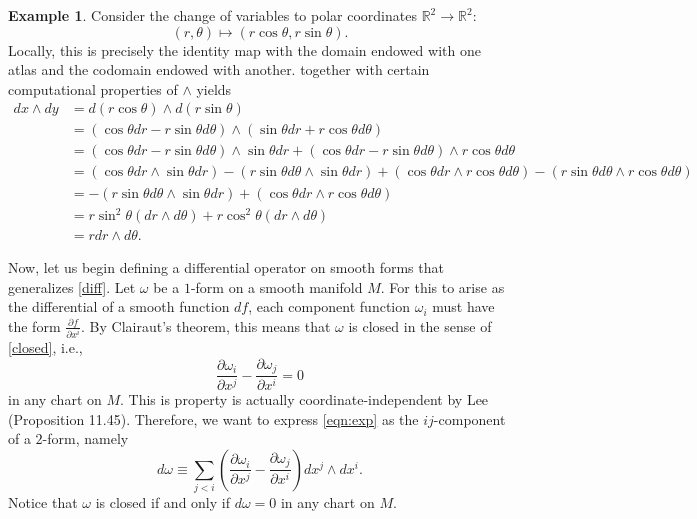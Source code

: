 \documentclass[10pt,letterpaper,cm]{nupset}
\theoremstyle{definition}
\newtheorem{exmp}[definition]{Example}
\theoremstyle{theorem}
\theoremstyle{remark}
\newcommand{\R}{\mathbb R}
\newcommand{\1}{\mathbf{1}}
\newcommand{\0}{\vec 0}
\begin{document}
\begin{exmp}
Consider the change of variables to polar coordinates $\R^2 \to \R^2$: $$\left(r, \theta\right) \mapsto \left(r\cos \theta, r\sin \theta\right).$$ Locally, this is precisely the identity map with the domain endowed with one atlas and the codomain endowed with another.  together with certain computational properties of $\wedge$ yields
\begin{align*}  dx \wedge dy & = d(r\cos \theta) \wedge d(r\sin \theta) \\ &=   \left(\cos \theta dr - r\sin \theta d\theta\right) \wedge \left(\sin \theta dr +r \cos \theta d\theta\right) \\ &= \left(\cos \theta dr - r\sin \theta d\theta\right) \wedge \sin \theta dr + \left(\cos \theta dr - r\sin \theta d\theta\right) \wedge r \cos \theta d\theta \\ & = \left(\cos \theta dr \wedge \sin \theta dr\right) - \left(r \sin \theta d \theta \wedge \sin \theta dr\right) +  \left(\cos \theta dr \wedge r \cos \theta d\theta\right) - \left(r\sin \theta d \theta \wedge r \cos \theta d \theta\right)\\ & =  {-\left(r \sin \theta d \theta \wedge \sin \theta dr\right)} +  \left(\cos \theta dr \wedge r \cos \theta d\theta\right) \\ & = r\sin^2\theta(dr \wedge d\theta) + r\cos^2 \theta(dr \wedge d\theta)\\ & = rdr \wedge d\theta.
\end{align*}
\end{exmp}

\bigskip

Now, let us begin defining a differential operator on smooth forms that generalizes \cref{diff}. Let $\omega$ be a $1$-form on a smooth manifold $M$. For this to arise as the differential of a smooth function $d{f}$, each component function $\omega_i$ must have the form $\frac{\partial{f}}{\partial{x^i}}$. By Clairaut's theorem, this means that $\omega$ is closed in the sense of \cref{closed}, i.e.,
\[ \label{eqn:exp}
\frac{\partial{\omega_i}}{\partial{x^j}} - \frac{\partial{\omega_j}}{\partial{x^i}} =0 \tag{$\ast$}
\] in any chart on $M$.
This is property is actually coordinate-independent by Lee (Proposition 11.45). Therefore, we want to express \eqref{eqn:exp} as the $ij$-component of a $2$-form, namely
\[
d{\omega}\equiv \sum_{j<i}\left(\frac{\partial \omega_{i}}{\partial x^{j}}-\frac{\partial \omega_{j}}{\partial x^{i}}\right) d x^{j} \wedge d x^{i}.
\] Notice that $\omega$ is closed if and only if $d{\omega} =0$ in any chart on $M$.
\end{document}
